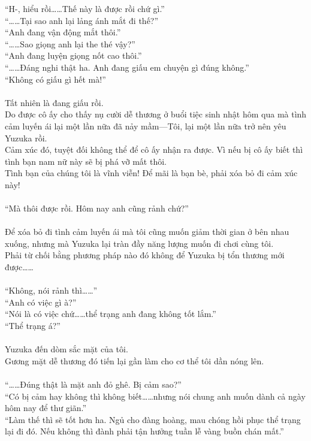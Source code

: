 \documentclass[12pt,a4paper, twosides]{book}
\begin{document}
“H-, hiểu rồi……Thế này là được rồi chứ gì.”\\
“……Tại sao anh lại lảng ánh mắt đi thế?”\\
“Anh đang vận động mắt thôi.”\\
“……Sao giọng anh lại the thé vậy?”\\
“Anh đang luyện giọng nốt cao thôi.”\\
“……Đáng nghi thật ha. Anh đang giấu em chuyện gì đúng không.”\\
“Không có giấu gì hết mà!”\\
\\
Tất nhiên là đang giấu rồi.\\
Do được cô ấy cho thấy nụ cười dễ thương ở buổi tiệc sinh nhật hôm qua mà tình cảm luyến ái lại một lần nữa đã nảy mầm—Tôi, lại một lần nữa trở nên yêu Yuzuka rồi.\\
Cảm xúc đó, tuyệt đối không thể để cô ấy nhận ra được. Vì nếu bị cô ấy biết thì tình bạn nam nữ này sẽ bị phá vỡ mất thôi.\\
Tình bạn của chúng tôi là vĩnh viễn! Để mãi là bạn bè, phải xóa bỏ đi cảm xúc này!\\
\\
“Mà thôi được rồi. Hôm nay anh cũng rảnh chứ?”\\
\\
Để xóa bỏ đi tình cảm luyến ái mà tôi cũng muốn giảm thời gian ở bên nhau xuống, nhưng mà Yuzuka lại tràn đầy năng lượng muốn đi chơi cùng tôi.\\
Phải từ chối bằng phương pháp nào đó không để Yuzuka bị tổn thương mới được……\\
\\
“Không, nói rảnh thì……”\\
“Anh có việc gì à?”\\
“Nói là có việc chứ……thể trạng anh đang không tốt lắm.”\\
“Thể trạng á?”\\
\\
Yuzuka đến dòm sắc mặt của tôi.\\
Gương mặt dễ thương đó tiến lại gần làm cho cơ thể tôi dần nóng lên.\\
\\
“……Đúng thật là mặt anh đỏ ghê. Bị cảm sao?”\\
“Có bị cảm hay không thì không biết……nhưng nói chung anh muốn dành cả ngày hôm nay để thư giãn.”\\
“Làm thế thì sẽ tốt hơn ha. Ngủ cho đàng hoàng, mau chóng hồi phục thể trạng lại đi đó. Nếu không thì đành phải tận hưởng tuần lễ vàng buồn chán mất.”\\
\end{document}
